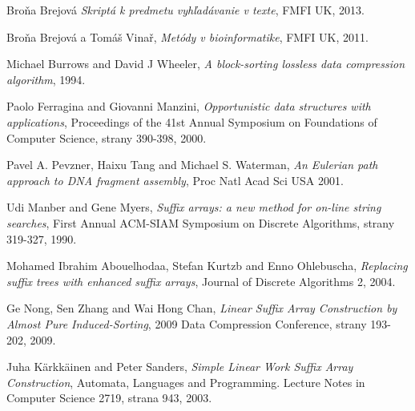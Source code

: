 \begin{thebibliography}{99}
 
        Broňa Brejová
        \emph{Skriptá k predmetu vyhľadávanie v texte},
        FMFI UK,
        2013.
        
        Broňa Brejová a Tomáš Vinař,
        \emph{Metódy v bioinformatike},
        FMFI UK,
        2011.
        
        Michael Burrows and David J Wheeler,
        \emph{A block-sorting lossless data compression algorithm},     
        1994.
        
        Paolo Ferragina and Giovanni Manzini,
        \emph{Opportunistic data structures with applications},
        Proceedings of the 41st Annual Symposium on Foundations of Computer
        Science, strany 390-398,
        2000.
        
        Pavel A. Pevzner, Haixu Tang and Michael S. Waterman,
        \emph{An Eulerian path approach to DNA fragment assembly},
        Proc Natl Acad Sci USA
        2001.
        
        Udi Manber and Gene Myers,
        \emph{Suffix arrays: a new method for on-line string searches},
        First Annual ACM-SIAM Symposium on Discrete Algorithms, strany 319-327,
        1990.
        
        Mohamed Ibrahim Abouelhodaa, Stefan Kurtzb and Enno Ohlebuscha,
        \emph{Replacing suffix trees with enhanced suffix arrays},
        Journal of Discrete Algorithms 2,
        2004.
        
        Ge Nong, Sen Zhang and Wai Hong Chan,
        \emph{Linear Suffix Array Construction by Almost Pure Induced-Sorting},
        2009 Data Compression Conference, strany 193-202,
        2009.
        
        Juha Kärkkäinen and Peter Sanders,
        \emph{Simple Linear Work Suffix Array Construction},
        Automata, Languages and Programming. Lecture Notes in Computer Science
        2719, strana 943,
        2003.


\end{thebibliography}